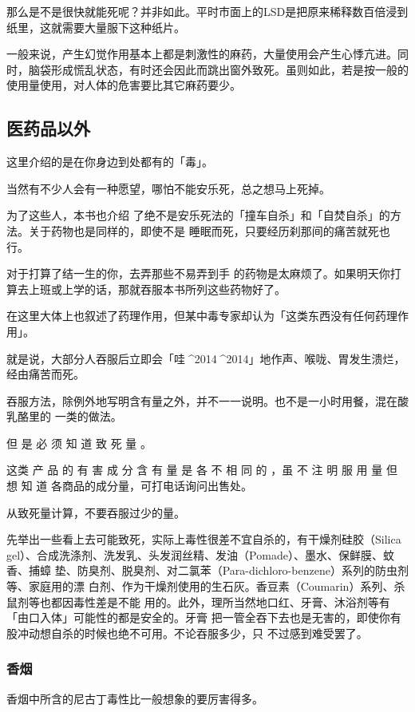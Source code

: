 \documentclass[UTF8]{ctexart}
\begin{document}
那么是不是很快就能死呢？并非如此。平时市面上的LSD是把原来稀释数百倍浸到纸里，这就需要大量服下这种纸片。

一般来说，产生幻觉作用基本上都是刺激性的麻药，大量使用会产生心悸亢进。同时，脑袋形成慌乱状态，有时还会因此而跳出窗外致死。虽则如此，若是按一般的使用量使用，对人体的危害要比其它麻药要少。

\subsection{医药品以外}

这里介绍的是在你身边到处都有的「毒」。

当然有不少人会有一种愿望，哪怕不能安乐死，总之想马上死掉。

为了这些人，本书也介绍
了绝不是安乐死法的「撞车自杀」和「自焚自杀」的方法。关于药物也是同样的，即使不是
睡眠而死，只要经历刹那间的痛苦就死也行。

对于打算了结一生的你，去弄那些不易弄到手
的药物是太麻烦了。如果明天你打算去上班或上学的话，那就吞服本书所列这些药物好了。

在这里大体上也叙述了药理作用，但某中毒专家却认为「这类东西没有任何药理作用」。

就是说，大部分人吞服后立即会「哇^^^^2014^^^^2014」地作声、喉咙、胃发生溃烂，经由痛苦而死。

吞服方法，除例外地写明含有量之外，并不一一说明。也不是一小时用餐，混在酸乳酪里的
一类的做法。

但 是 必 须 知 道 致 死 量 。

这类 产 品 的 有 害 成 分 含 有 量 是 各 不 相 同 的 ，虽 不 注 明 服 用 量 但 想 知 道 各商品的成分量，可打电话询问出售处。

从致死量计算，不要吞服过少的量。

先举出一些看上去可能致死，实际上毒性很差不宜自杀的，有干燥剂硅胶（Silica
gel）、合成洗涤剂、洗发乳、头发润丝精、发油（Pomade）、墨水、保鲜膜、蚊香、捕蟑
垫、防臭剂、脱臭剂、对二氯苯（Para-dichloro-benzene）系列的防虫剂等、家庭用的漂
白剂、作为干燥剂使用的生石灰。香豆素（Coumarin）系列、杀鼠剂等也都因毒性差是不能
用的。此外，理所当然地口红、牙膏、沐浴剂等有「由口入体」可能性的都是安全的。牙膏
把一管全吞下去也是无害的，即使你有股冲动想自杀的时候也绝不可用。不论吞服多少，只
不过感到难受罢了。

\subsubsection{香烟}

香烟中所含的尼古丁毒性比一般想象的要厉害得多。
\end{document}
